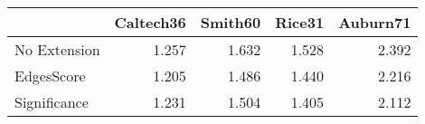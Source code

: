 \begin{tabular}{lrrrr}
\toprule
{} & Caltech36 & Smith60 & Rice31 & Auburn71 \\
\midrule
No Extension &     1.257 &   1.632 &  1.528 &    2.392 \\
EdgesScore   &     1.205 &   1.486 &  1.440 &    2.216 \\
Significance &     1.231 &   1.504 &  1.405 &    2.112 \\
\bottomrule
\end{tabular}
